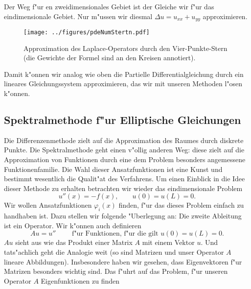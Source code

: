 Der Weg f"ur en zweidimensionales Gebiet ist der Gleiche wir f"ur das eindimensionale Gebiet. Nur m"ussen wir diesmal $\Delta u = u_{xx}+u_{yy}$ approximieren. 




\begin{figure}[htbp]
 \centering
   \texttt{[image: ../figures/pdeNumStertn.pdf]}
   \caption{Approximation des Laplace-Operators durch den Vier-Punkte-Stern (die Gewichte der Formel sind an den Kreisen annotiert). }
   \label{pdeNumstern}
\end{figure}


Damit k"onnen wir analog wie oben die Partielle Differentialgleichung
durch ein lineares Gleichungssystem approximieren, das wir mit unseren Methoden l"osen k"onnen.


\subsection{Spektralmethode f"ur Elliptische Gleichungen}
Die Differenzenmethode zielt auf die Approximation des Raumes durch
diskrete Punkte. Die Spektralmethode geht einen v"ollig anderen Weg: diese zielt auf die Approximation von Funktionen durch eine dem Problem besonders
angemessene Funktionenfamilie. Die Wahl dieser Ansatzfunktionen ist eine 
Kunst und bestimmt wesentlich die Qualit"at des Verfahrens. 
Um einen Einblick in die Idee dieser Methode zu erhalten
 betrachten wir wieder das eindimensionale Problem
 $$ u''(x) = -f(x),\qquad u(0)=u(L)=0. $$
Wir wollen Ansatzfunktionen $\varphi_i(x)$ finden, f"ur das dieses
Problem einfach zu handhaben ist. Dazu stellen wir folgende "Uberlegung an: Die zweite Ableitung ist ein Operator. Wir k"onnen 
auch definieren
$$ A u = u''\qquad \mbox{ f"ur Funktionen, f"ur die gilt } u(0)=u(L)=0.$$
$Au$ sieht aus wie das Produkt einer Matrix $A$ mit einem Vektor $u$. 
Und tats"achlich geht die Analogie weit (so sind Matrizen und unser Operator $A$ lineare Abbildungen). Insbesondere haben wir gesehen, 
dass Eigenvektoren f"ur Matrizen besonders wichtig sind. 
Das f"uhrt auf das Problem, f"ur unseren Operator $A$ Eigenfunktionen zu finden

